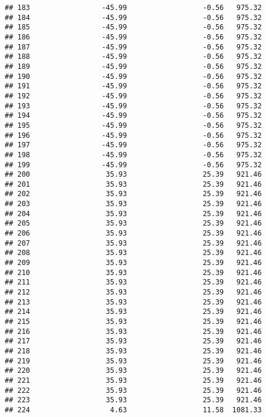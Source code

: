 \documentclass[]{article}
\begin{document}
\begin{verbatim}
## 183                 -45.99                  -0.56   975.32
## 184                 -45.99                  -0.56   975.32
## 185                 -45.99                  -0.56   975.32
## 186                 -45.99                  -0.56   975.32
## 187                 -45.99                  -0.56   975.32
## 188                 -45.99                  -0.56   975.32
## 189                 -45.99                  -0.56   975.32
## 190                 -45.99                  -0.56   975.32
## 191                 -45.99                  -0.56   975.32
## 192                 -45.99                  -0.56   975.32
## 193                 -45.99                  -0.56   975.32
## 194                 -45.99                  -0.56   975.32
## 195                 -45.99                  -0.56   975.32
## 196                 -45.99                  -0.56   975.32
## 197                 -45.99                  -0.56   975.32
## 198                 -45.99                  -0.56   975.32
## 199                 -45.99                  -0.56   975.32
## 200                  35.93                  25.39   921.46
## 201                  35.93                  25.39   921.46
## 202                  35.93                  25.39   921.46
## 203                  35.93                  25.39   921.46
## 204                  35.93                  25.39   921.46
## 205                  35.93                  25.39   921.46
## 206                  35.93                  25.39   921.46
## 207                  35.93                  25.39   921.46
## 208                  35.93                  25.39   921.46
## 209                  35.93                  25.39   921.46
## 210                  35.93                  25.39   921.46
## 211                  35.93                  25.39   921.46
## 212                  35.93                  25.39   921.46
## 213                  35.93                  25.39   921.46
## 214                  35.93                  25.39   921.46
## 215                  35.93                  25.39   921.46
## 216                  35.93                  25.39   921.46
## 217                  35.93                  25.39   921.46
## 218                  35.93                  25.39   921.46
## 219                  35.93                  25.39   921.46
## 220                  35.93                  25.39   921.46
## 221                  35.93                  25.39   921.46
## 222                  35.93                  25.39   921.46
## 223                  35.93                  25.39   921.46
## 224                   4.63                  11.58  1081.33

\end{verbatim}
\end{document}

